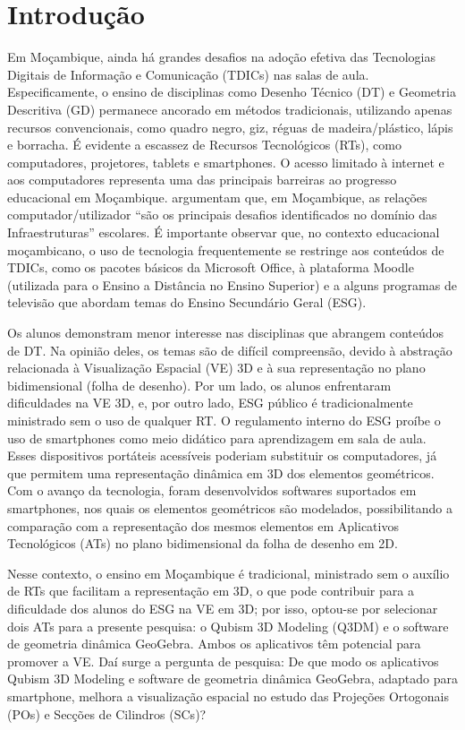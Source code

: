 \section{Introdução}\label{sec-introdução}

Em Moçambique, ainda há grandes desafios na adoção efetiva das
Tecnologias Digitais de Informação e Comunicação (TDICs) nas salas de
aula. Especificamente, o ensino de disciplinas como Desenho Técnico (DT)
e Geometria Descritiva (GD) permanece ancorado em métodos tradicionais,
utilizando apenas recursos convencionais, como quadro negro, giz, réguas
de madeira/plástico, lápis e borracha. É evidente a escassez de Recursos
Tecnológicos (RTs), como computadores, projetores, tablets e
smartphones. O acesso limitado à internet e aos computadores representa
uma das principais barreiras ao progresso educacional em Moçambique. \textcite[p. 16]{ali2018} argumentam que, em Moçambique, as relações
computador/utilizador \enquote{são os principais desafios identificados no
domínio das Infraestruturas} escolares. É importante observar que, no
contexto educacional moçambicano, o uso de tecnologia frequentemente se
restringe aos conteúdos de TDICs, como os pacotes básicos da Microsoft
Office, à plataforma Moodle (utilizada para o Ensino a Distância no
Ensino Superior) e a alguns programas de televisão que abordam temas do
Ensino Secundário Geral (ESG).

Os alunos demonstram menor interesse nas disciplinas que abrangem
conteúdos de DT. Na opinião deles, os temas são de difícil compreensão,
devido à abstração relacionada à Visualização Espacial (VE) 3D e à sua
representação no plano bidimensional (folha de desenho). Por um lado, os
alunos enfrentaram dificuldades na VE 3D, e, por outro lado, ESG público
é tradicionalmente ministrado sem o uso de qualquer RT. O regulamento
interno do ESG proíbe o uso de smartphones como meio didático para
aprendizagem em sala de aula. Esses dispositivos portáteis acessíveis
poderiam substituir os computadores, já que permitem uma representação
dinâmica em 3D dos elementos geométricos. Com o avanço da tecnologia,
foram desenvolvidos softwares suportados em smartphones, nos quais os
elementos geométricos são modelados, possibilitando a comparação com a
representação dos mesmos elementos em Aplicativos Tecnológicos (ATs) no
plano bidimensional da folha de desenho em 2D.

Nesse contexto, o ensino em Moçambique é tradicional, ministrado sem o
auxílio de RTs que facilitam a representação em 3D, o que pode
contribuir para a dificuldade dos alunos do ESG na VE em 3D; por isso,
optou-se por selecionar dois ATs para a presente pesquisa: o Qubism 3D
Modeling (Q3DM) e o software de geometria dinâmica GeoGebra. Ambos os
aplicativos têm potencial para promover a VE. Daí surge a pergunta de
pesquisa: De que modo os aplicativos Qubism 3D Modeling e software de
geometria dinâmica GeoGebra, adaptado para smartphone, melhora a
visualização espacial no estudo das Projeções Ortogonais (POs) e Secções
de Cilindros (SCs)?

